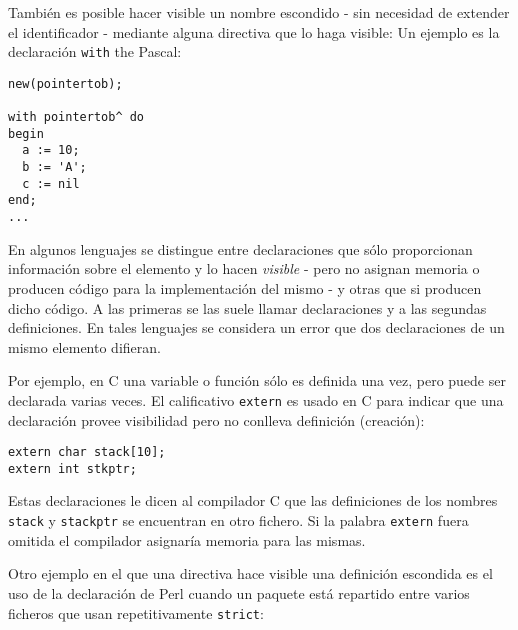 También es posible hacer visible un nombre escondido - sin necesidad de extender el identificador - 
mediante alguna directiva que lo haga visible: 
Un ejemplo es la declaración \verb|with| the Pascal:

\begin{verbatim}
new(pointertob);
 
with pointertob^ do
begin
  a := 10;
  b := 'A';
  c := nil
end;
...

\end{verbatim}


En algunos lenguajes se distingue entre declaraciones que sólo proporcionan información sobre el elemento
y lo hacen \emph{visible} - pero no asignan memoria o producen código para la implementación del mismo - y otras
que si producen dicho código. A las primeras se las suele llamar declaraciones
y a las segundas definiciones.
En tales lenguajes se considera un error que dos declaraciones de un mismo elemento difieran.


Por ejemplo, en C una variable o función sólo es definida una vez,
pero puede ser declarada varias veces.
El calificativo \verb|extern| es usado en C para indicar que una declaración provee
visibilidad pero no conlleva definición (creación):

\begin{verbatim}
extern char stack[10];
extern int stkptr;
\end{verbatim}

Estas declaraciones le dicen al compilador C que las definiciones de los nombres
\verb|stack| y \verb|stackptr| se encuentran en otro fichero. 
Si la palabra \verb|extern| fuera omitida el compilador asignaría memoria para
las mismas.

Otro ejemplo en el que una directiva hace visible una definición escondida
es el uso de la declaración  de Perl cuando un paquete está repartido
entre varios ficheros que usan repetitivamente \verb|strict|:

